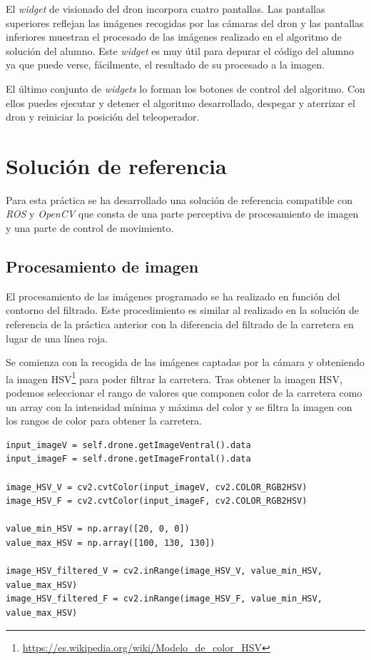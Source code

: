 El \textit{widget} de visionado del dron incorpora cuatro pantallas. Las pantallas superiores reflejan las imágenes recogidas por las cámaras del dron y las pantallas inferiores muestran el procesado de las imágenes realizado en el algoritmo de solución del alumno. Este \textit{widget} es muy útil para depurar el código del alumno ya que puede verse, fácilmente, el resultado de su procesado a la imagen.

El último conjunto de \textit{widgets} lo forman los botones de control del algoritmo. Con ellos puedes ejecutar y detener el algoritmo desarrollado, despegar y aterrizar el dron y reiniciar la posición del teleoperador.

\section{Solución de referencia}
Para esta práctica se ha desarrollado una solución de referencia compatible con \textit{ROS} y \textit{OpenCV} que consta de una parte perceptiva de procesamiento de imagen y una parte de control de movimiento.

\subsection{Procesamiento de imagen}
El procesamiento de las imágenes programado se ha realizado en función del contorno del filtrado. Este procedimiento es similar al realizado en la solución de referencia de la práctica anterior con la diferencia del filtrado de la carretera en lugar de una línea roja. 

Se comienza con la recogida de las imágenes captadas por la cámara y obteniendo la imagen HSV\footnote{\url{https://es.wikipedia.org/wiki/Modelo_de_color_HSV}} para poder filtrar la carretera. Tras obtener la imagen HSV, podemos seleccionar el rango de valores que componen color de la carretera como un array con la intensidad mínima y máxima del color y se filtra la imagen con los rangos de color para obtener la carretera.

\lstset{language=Python, breaklines=true, basicstyle=\footnotesize}
\begin{lstlisting}[frame=single]
input_imageV = self.drone.getImageVentral().data
input_imageF = self.drone.getImageFrontal().data

image_HSV_V = cv2.cvtColor(input_imageV, cv2.COLOR_RGB2HSV)
image_HSV_F = cv2.cvtColor(input_imageF, cv2.COLOR_RGB2HSV)

value_min_HSV = np.array([20, 0, 0])
value_max_HSV = np.array([100, 130, 130])

image_HSV_filtered_V = cv2.inRange(image_HSV_V, value_min_HSV, value_max_HSV)
image_HSV_filtered_F = cv2.inRange(image_HSV_F, value_min_HSV, value_max_HSV)
\end{lstlisting}

